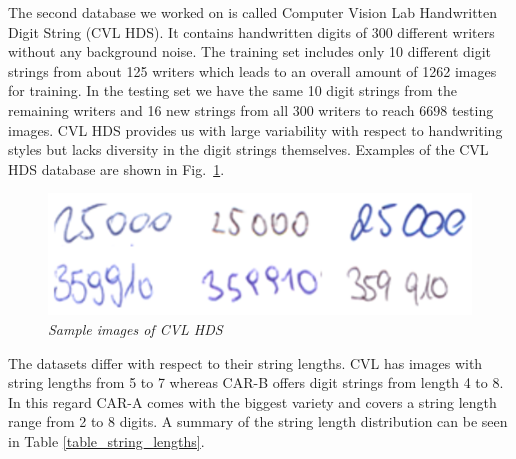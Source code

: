 The second database we worked on is called Computer Vision Lab Handwritten Digit String (CVL HDS). It contains handwritten digits of 300 different writers without any background noise. The training set includes only 10 different digit strings from about 125 writers which leads to an overall amount of 1262 images for training. In the testing set we have the same 10 digit strings from the remaining writers and 16 new strings from all 300 writers to reach 6698 testing images. CVL HDS provides us with large variability with respect to handwriting styles but lacks diversity in the digit strings themselves. Examples of the CVL HDS database are shown in Fig.~\ref{fig:cvl}.

\begin{figure}
  \includegraphics[width=\linewidth]{images/CVL-HDS-Splitted.png}
  \caption{\it Sample images of CVL HDS}
  \label{fig:cvl}
\end{figure}

The datasets differ with respect to their string lengths. CVL has images with string lengths from 5 to 7 whereas CAR-B offers digit strings from length 4 to 8. In this regard CAR-A comes with the biggest variety and covers a string length range from 2 to 8 digits. A summary of the string length distribution can be seen in Table \ref{table_string_lengths}.

